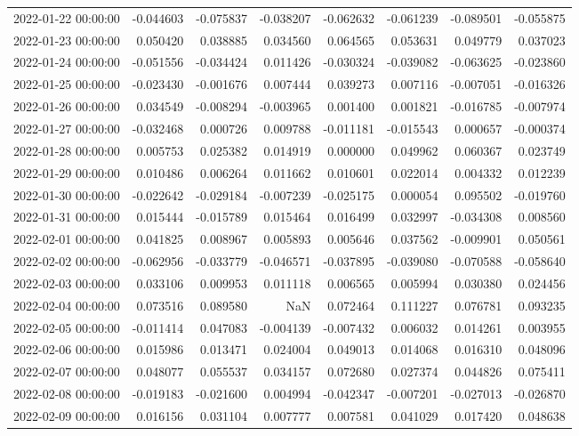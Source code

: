 \begin{tabular}{lrrrrrrr}
2022-01-22 00:00:00 & -0.044603 & -0.075837 & -0.038207 & -0.062632 & -0.061239 & -0.089501 & -0.055875 \\
2022-01-23 00:00:00 & 0.050420 & 0.038885 & 0.034560 & 0.064565 & 0.053631 & 0.049779 & 0.037023 \\
2022-01-24 00:00:00 & -0.051556 & -0.034424 & 0.011426 & -0.030324 & -0.039082 & -0.063625 & -0.023860 \\
2022-01-25 00:00:00 & -0.023430 & -0.001676 & 0.007444 & 0.039273 & 0.007116 & -0.007051 & -0.016326 \\
2022-01-26 00:00:00 & 0.034549 & -0.008294 & -0.003965 & 0.001400 & 0.001821 & -0.016785 & -0.007974 \\
2022-01-27 00:00:00 & -0.032468 & 0.000726 & 0.009788 & -0.011181 & -0.015543 & 0.000657 & -0.000374 \\
2022-01-28 00:00:00 & 0.005753 & 0.025382 & 0.014919 & 0.000000 & 0.049962 & 0.060367 & 0.023749 \\
2022-01-29 00:00:00 & 0.010486 & 0.006264 & 0.011662 & 0.010601 & 0.022014 & 0.004332 & 0.012239 \\
2022-01-30 00:00:00 & -0.022642 & -0.029184 & -0.007239 & -0.025175 & 0.000054 & 0.095502 & -0.019760 \\
2022-01-31 00:00:00 & 0.015444 & -0.015789 & 0.015464 & 0.016499 & 0.032997 & -0.034308 & 0.008560 \\
2022-02-01 00:00:00 & 0.041825 & 0.008967 & 0.005893 & 0.005646 & 0.037562 & -0.009901 & 0.050561 \\
2022-02-02 00:00:00 & -0.062956 & -0.033779 & -0.046571 & -0.037895 & -0.039080 & -0.070588 & -0.058640 \\
2022-02-03 00:00:00 & 0.033106 & 0.009953 & 0.011118 & 0.006565 & 0.005994 & 0.030380 & 0.024456 \\
2022-02-04 00:00:00 & 0.073516 & 0.089580 & NaN & 0.072464 & 0.111227 & 0.076781 & 0.093235 \\
2022-02-05 00:00:00 & -0.011414 & 0.047083 & -0.004139 & -0.007432 & 0.006032 & 0.014261 & 0.003955 \\
2022-02-06 00:00:00 & 0.015986 & 0.013471 & 0.024004 & 0.049013 & 0.014068 & 0.016310 & 0.048096 \\
2022-02-07 00:00:00 & 0.048077 & 0.055537 & 0.034157 & 0.072680 & 0.027374 & 0.044826 & 0.075411 \\
2022-02-08 00:00:00 & -0.019183 & -0.021600 & 0.004994 & -0.042347 & -0.007201 & -0.027013 & -0.026870 \\
2022-02-09 00:00:00 & 0.016156 & 0.031104 & 0.007777 & 0.007581 & 0.041029 & 0.017420 & 0.048638 \\

\end{tabular}
